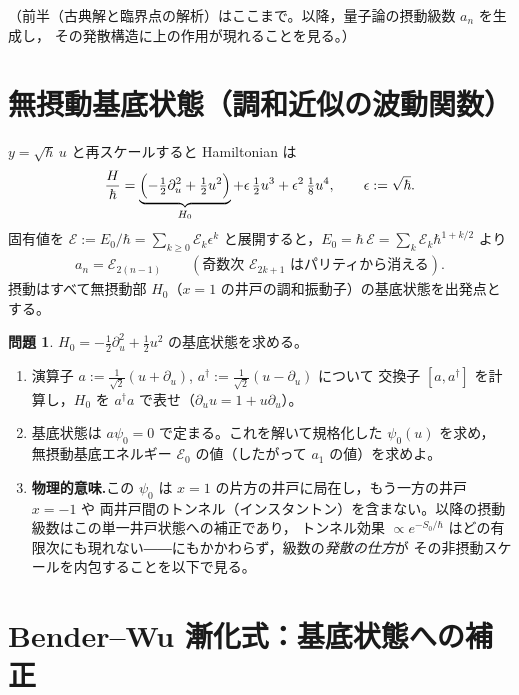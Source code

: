 \documentclass[dvipdfmx, uplatex]{jsarticle}
\newcommand{\hb}{\hbar}
\newcommand{\cE}{\mathcal{E}}
\theoremstyle{definition}
\newtheorem{prob}{問題}
\begin{document}
\noindent（前半（古典解と臨界点の解析）はここまで。以降，量子論の摂動級数 $a_n$ を生成し，
その発散構造に上の作用が現れることを見る。）

\section{無摂動基底状態（調和近似の波動関数）}
$y=\sqrt{\hb}\,u$ と再スケールすると Hamiltonian は
\begin{align}
    \frac{H}{\hb}=\underbrace{\Bigl(-\tfrac12\partial_u^2+\tfrac12u^2\Bigr)}_{H_0}
    +\epsilon\,\tfrac12u^3+\epsilon^2\,\tfrac18u^4,\qquad \epsilon:=\sqrt{\hb}.
\label{eq:Hresc}
\end{align}
固有値を $\cE:=E_0/\hb=\sum_{k\ge0}\cE_k\epsilon^k$ と展開すると，$E_0=\hb\,\cE=\sum_k\cE_k\hb^{1+k/2}$ より
\begin{align}
    a_n=\cE_{2(n-1)}\qquad(\text{奇数次 }\cE_{2k+1}\text{ はパリティから消える}).
\label{eq:map}
\end{align}
摂動はすべて無摂動部 $H_0$（$x=1$ の井戸の調和振動子）の基底状態を出発点とする。

\begin{prob}\label{prob:vac}
$H_0=-\tfrac12\partial_u^2+\tfrac12u^2$ の基底状態を求める。
\begin{enumerate}
\item 演算子 $a:=\tfrac1{\sqrt2}(u+\partial_u)$, $a^\dagger:=\tfrac1{\sqrt2}(u-\partial_u)$ について
交換子 $[a,a^\dagger]$ を計算し，$H_0$ を $a^\dagger a$ で表せ（$\partial_u u=1+u\partial_u$）。
\item 基底状態は $a\psi_0=0$ で定まる。これを解いて規格化した $\psi_0(u)$ を求め，
無摂動基底エネルギー $\cE_0$ の値（したがって $a_1$ の値）を求めよ。
\item \textbf{物理的意味.}この $\psi_0$ は $x=1$ の片方の井戸に局在し，もう一方の井戸 $x=-1$ や
両井戸間のトンネル（インスタントン）を含まない。以降の摂動級数はこの単一井戸状態への補正であり，
トンネル効果 $\propto e^{-S_0/\hb}$ はどの有限次にも現れない――にもかかわらず，級数の\emph{発散の仕方}が
その非摂動スケールを内包することを以下で見る。
\end{enumerate}
\end{prob}

\section{Bender--Wu 漸化式：基底状態への補正}
\end{document}
